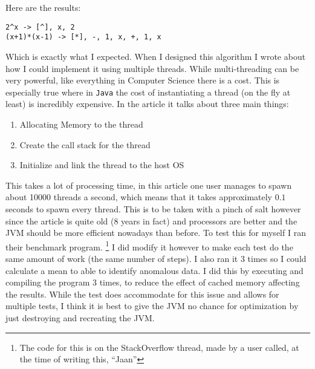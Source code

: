 \documentclass[../../../../main.tex]{subfiles}
\begin{document}
Here are the results:
\begin{verbatim}
2^x -> [^], x, 2
(x+1)*(x-1) -> [*], -, 1, x, +, 1, x
\end{verbatim}
Which is exactly what I expected.
\newpage
When I designed this algorithm I wrote about how I could implement it using multiple threads. While multi-threading can be very powerful, like everything in Computer Science there is a cost. This is especially true where in \texttt{Java} the cost of instantiating a thread\cite{threadCreationJava} (on the fly at least) is incredibly expensive. In the article it talks about three main things:
\begin{enumerate}
\item Allocating Memory to the thread
\item Create the call stack for the thread\cite{threadStackJava, callStack}
\item Initialize and link the thread to the host OS
\end{enumerate}
This takes a lot of processing time, in this article\cite{threadCreationRate} one user manages to spawn about 10000 threads a second, which means that it takes approximately $0.1$ seconds to spawn every thread. This is to be taken with a pinch of salt however since the article is quite old (8 years in fact) and processors are better and the JVM should be more efficient nowadays than before. To test this for myself I ran their benchmark program.
\footnote{The code for this is on the StackOverflow thread, made by a user called, at the time of writing this, ``Jaan''\cite{threadCreationRate}} 
I did modify it however to make each test do the same amount of work (the same number of steps). I also ran it 3 times so I could calculate a mean to able to identify anomalous data. I did this by executing and compiling the program 3 times, to reduce the effect of cached memory affecting the results. While the test does accommodate for this issue and allows for multiple tests, I think it is best to give the JVM no chance for optimization by just destroying and recreating the JVM.

\newpage
\end{document}
